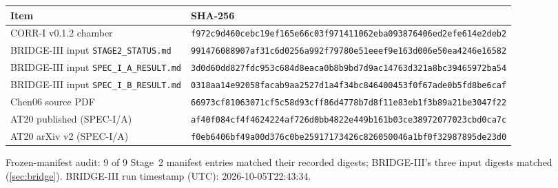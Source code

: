 \documentclass[11pt,a4paper]{article}
\theoremstyle{definition}
\theoremstyle{remark}
\begin{document}
\begin{tabular}{@{}>{\raggedright\arraybackslash}p{4.4cm}l@{}}\toprule Item & SHA-256\\\midrule
CORR-I v0.1.2 chamber & \texttt{\scriptsize f972c9d460cebc19ef165e66c03f971411062eba093876406ed2efe614e2deb2}\\
BRIDGE-III input \texttt{STAGE2\_STATUS.md} & \texttt{\scriptsize 991476088907af31c6d0256a992f79780e51eeef9e163d006e50ea4246e16582} \\
BRIDGE-III input \texttt{SPEC\_I\_A\_RESULT.md} & \texttt{\scriptsize 3d0d60dd827fdc953c684d8eaca0b8b9bd7d9ac14763d321a8bc39465972ba54} \\
BRIDGE-III input \texttt{SPEC\_I\_B\_RESULT.md} & \texttt{\scriptsize 0318aa14e92058facab9aa2527d1a4f34bc846400453f0f67ade0b5fd8be6caf} \\
Chen06 source PDF & \texttt{\scriptsize 66973cf81063071cf5c58d93cff86d4778b7d8f11e83eb1f3b89a21be3047f22}\\
AT20 published (SPEC-I/A) & \texttt{\scriptsize af40f084cf4f4624224af726d0bb4822e449b161b03ce38972077023cbd0ca7c}\\
AT20 arXiv v2 (SPEC-I/A) & \texttt{\scriptsize f0eb6406bf49a00d376c0be25917173426c826050046a1bf0f32987895de23d0}\\
\bottomrule\end{tabular}

\medskip
\noindent Frozen-manifest audit: 9 of 9 Stage~2 manifest entries matched their recorded digests; BRIDGE-III's three input digests matched (\cref{sec:bridge}). BRIDGE-III run timestamp (UTC): 2026-10-05T22:43:34.
\end{document}
